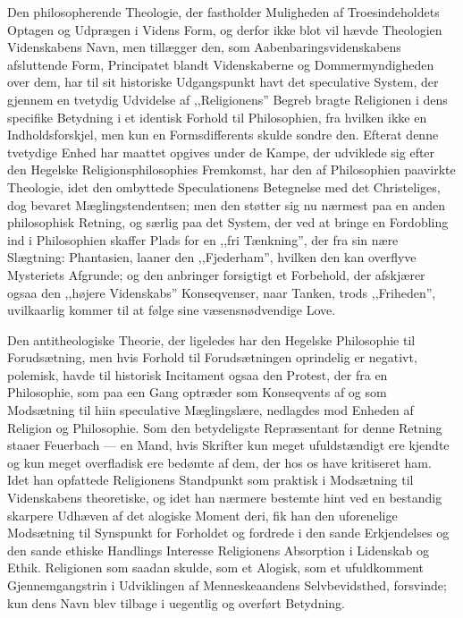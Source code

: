 \documentclass[12pt,a4paper]{article}
\begin{document}
Den philosopherende Theologie, der fastholder Muligheden af
Troesindeholdets Optagen og Udprægen i Videns Form, og derfor ikke
blot vil hævde Theologien Videnskabens Navn, men tillægger den, som
Aabenbaringsvidenskabens afsluttende Form, Principatet blandt
Videnskaberne og Dommermyndigheden over dem, har til sit historiske
Udgangspunkt havt det speculative System, der gjennem en tvetydig
Udvidelse af ,,Religionens'' Begreb bragte Religionen i dens specifike
Betydning i et identisk Forhold til Philosophien, fra hvilken ikke en
Indholdsforskjel, men kun en Formsdifferents skulde sondre den.
Efterat denne tvetydige Enhed har maattet opgives under de Kampe, der
udviklede sig efter den Hegelske Religionsphilosophies Fremkomst, har
den af Philosophien paavirkte Theologie, idet den ombyttede
Speculationens Betegnelse med det Christeliges, dog bevaret
Mæglingstendentsen; men den støtter sig nu nærmest paa en anden
philosophisk Retning, og særlig paa det System, der ved at bringe en
Fordobling ind i Philosophien skaffer Plads for en ,,fri Tænkning'',
der fra sin nære Slægtning: Phantasien, laaner den ,,Fjederham'',
hvilken den kan overflyve Mysteriets Afgrunde; og den anbringer
forsigtigt et Forbehold, der afskjærer ogsaa den ,,højere Videnskabs''
Konseqvenser, naar Tanken, trods ,,Friheden'', uvilkaarlig kommer til
at følge sine væsensnødvendige Love.

Den antitheologiske Theorie, der ligeledes har den Hegelske Philosophie
til Forudsætning, men hvis Forhold til Forudsætningen oprindelig er
negativt, polemisk, havde til historisk Incitament ogsaa den Protest,
der fra en Philosophie, som paa een Gang optræder som Konseqvents af
og som Modsætning til hiin speculative Mæglingslære, nedlagdes mod
Enheden af Religion og Philosophie. Som den betydeligste Repræsentant
for denne Retning staaer Feuerbach --- en Mand, hvis Skrifter kun
meget ufuldstændigt ere kjendte og kun meget overfladisk ere bedømte
af dem, der hos os have kritiseret ham. Idet han opfattede Religionens
Standpunkt som praktisk i Modsætning til Videnskabens theoretiske, og
idet han nærmere bestemte hint ved en bestandig skarpere Udhæven af
det alogiske Moment deri, fik han den uforenelige Modsætning til
Synspunkt for Forholdet og fordrede i den sande Erkjendelses og den
sande ethiske Handlings Interesse Religionens Absorption i Lidenskab
og Ethik. Religionen som saadan skulde, som et Alogisk, som et
ufuldkomment Gjennemgangstrin i Udviklingen af Menneskeaandens
Selvbevidsthed, forsvinde; kun dens Navn blev tilbage i uegentlig og
overført Betydning.
\end{document}
